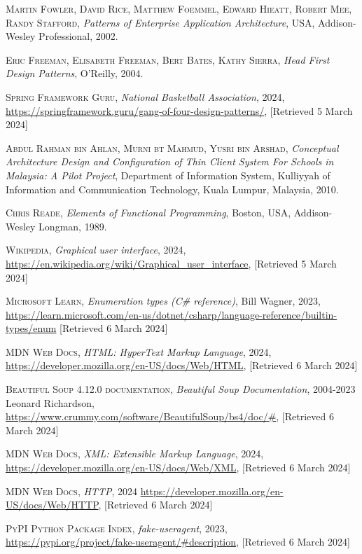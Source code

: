 \documentclass{thesis-ekf}
\theoremstyle{definition}
\theoremstyle{remark}
\begin{document}
\begin{thebibliography}{2}
\textsc{Martin Fowler, David Rice, Matthew Foemmel, Edward Hieatt, Robert Mee, Randy Stafford},
\emph{Patterns of Enterprise Application Architecture},
USA, Addison-Wesley Professional, 2002.

\textsc{Eric Freeman, Elisabeth Freeman, Bert Bates, Kathy Sierra},
\emph{Head First Design Patterns},
O'Reilly, 2004.

\textsc{Spring Framework Guru},
\emph{National Basketball Association}, 2024, 
\url{https://springframework.guru/gang-of-four-design-patterns/}, [Retrieved 5 March 2024]

\textsc{Abdul Rahman bin Ahlan, Murni bt Mahmud, Yusri bin Arshad},
\emph{Conceptual Architecture Design and Configuration of Thin Client System For Schools in Malaysia: A Pilot Project}, 
Department of Information System, Kulliyyah of Information and Communication Technology,
Kuala Lumpur, Malaysia, 2010.

\textsc{Chris Reade},
\emph{Elements of Functional Programming}, 
Boston, USA, Addison-Wesley Longman, 1989.

\textsc{Wikipedia},
\emph{Graphical user interface}, 2024,
\url{https://en.wikipedia.org/wiki/Graphical_user_interface}, [Retrieved 5 March 2024]

\textsc{Microsoft Learn},
\emph{Enumeration types (C\# reference)}, Bill Wagner, 2023,
\url{https://learn.microsoft.com/en-us/dotnet/csharp/language-reference/builtin-types/enum} [Retrieved 6 March 2024]

\textsc{MDN Web Docs},
\emph{HTML: HyperText Markup Language}, 2024,
\url{https://developer.mozilla.org/en-US/docs/Web/HTML}, [Retrieved 6 March 2024]

\textsc{Beautiful Soup 4.12.0 documentation}, 
\emph{Beautiful Soup Documentation}, 2004-2023 Leonard Richardson,
\url{https://www.crummy.com/software/BeautifulSoup/bs4/doc/#}, [Retrieved 6 March 2024]

\textsc{MDN Web Docs}, 
\emph{XML: Extensible Markup Language}, 2024,
\url{https://developer.mozilla.org/en-US/docs/Web/XML}, [Retrieved 6 March 2024]

\textsc{MDN Web Docs}, 
\emph{HTTP}, 2024
\url{https://developer.mozilla.org/en-US/docs/Web/HTTP}, [Retrieved 6 March 2024]

\textsc{PyPI Python Package Index},
\emph{fake-useragent}, 2023,
\url{https://pypi.org/project/fake-useragent/#description}, [Retrieved 6 March 2024]


\end{thebibliography}
\end{document}

